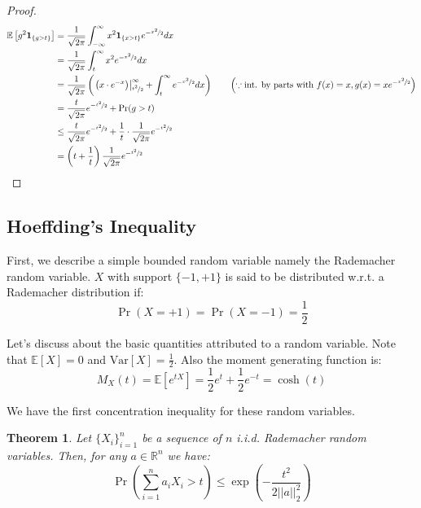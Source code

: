 \documentclass{article}
\newtheorem{theorem}{Theorem}[subsection]
\theoremstyle{remark}
\newcommand{\real}{\mathbb{R}}
\newcommand{\Exp}{\mathbb{E}}
\newcommand{\Var}{\mathrm{Var}}
\newcommand{\indic}[1]{\mathbf{1}_{\{#1\}}}
\begin{document}
\begin{proof}
\begin{align*}
\Exp\left[g^{2} \indic{g > t}\right] &= \frac{1}{\sqrt{2\pi}}\int_{-\infty}^{\infty} x^{2} \indic{x > t} e^{-\nicefrac{x^{2}}{2}} dx \\
&= \frac{1}{\sqrt{2\pi}}\int_{t}^{\infty} x^{2} e^{-\nicefrac{x^{2}}{2}} dx \\
&= \frac{1}{\sqrt{2\pi}}\left(\left.\left(x \cdot e^{-x}\right)\right\rvert_{\nicefrac{t^{2}}{2}}^{\infty} + \int_{t}^{\infty} e^{-\nicefrac{x^{2}}{2}}dx\right) \qquad \left(\because \text{int. by parts with } f(x) = x, g(x) = xe^{-\nicefrac{x^{2}}{2}}\right) \\
&= \frac{t}{\sqrt{2\pi}}e^{-\nicefrac{t^{2}}{2}} + \Pr(g > t) \\
&\leq \frac{t}{\sqrt{2\pi}}e^{-\nicefrac{t^{2}}{2}} + \frac{1}{t}\cdot \frac{1}{\sqrt{2\pi}}e^{-\nicefrac{t^{2}}{2}} \\
&= \left(t + \frac{1}{t}\right)\frac{1}{\sqrt{2\pi}}e^{-\nicefrac{t^{2}}{2}}
\end{align*}
\end{proof}

\subsection{Hoeffding's Inequality}
First, we describe a simple bounded random variable namely the Rademacher random variable. \(X\) with support \(\{-1, +1\}\) is said to be distributed w.r.t. a Rademacher distribution if:
\begin{equation*}
\Pr(X = +1) = \Pr(X = -1) = \frac{1}{2}
\end{equation*}

Let's discuss about the basic quantities attributed to a random variable. Note that \(\Exp[X] = 0\) and \(\Var[X] = \frac{1}{2}\). Also the moment generating function is:
\begin{equation*}
M_{X}(t) = \Exp\left[e^{tX}\right] = \frac{1}{2}e^{t} + \frac{1}{2}e^{-t} = \cosh(t)
\end{equation*}

We have the first concentration inequality for these random variables.
\begin{theorem}
\label{thm:rademacher-hoeffding}
Let \(\{X_{i}\}_{i=1}^{n}\) be a sequence of \(n\) i.i.d. Rademacher random variables. Then, for any \(a \in \real^{n}\) we have:
\begin{equation*}
\Pr\left(\sum_{i=1}^{n}a_{i}X_{i} > t\right) \leq \exp\left(-\frac{t^{2}}{2||a||_{2}^{2}}\right)
\end{equation*}
\end{theorem}
\end{document}
